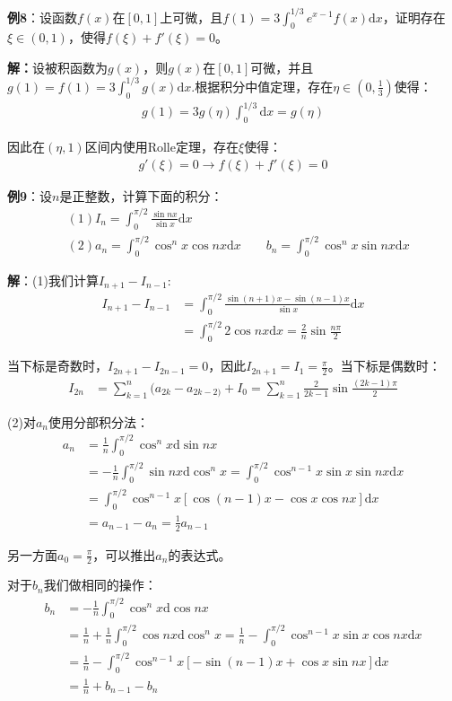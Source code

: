 \documentclass{ctexart}
\let\oldtextbf\textbf %
\renewcommand{\textbf}[1]{\textcolor{btex}{\oldtextbf{#1}}} %
\begin{document}
\textbf{例8}：设函数$f(x)$在$[0,1]$上可微，且$f(1)=3\int_0^{1/3}e^{x-1}f(x)\mathrm{d}x$，证明存在$\xi\in(0,1)$，使得$f(\xi)+f'(\xi)=0$。

\textbf{解：}设被积函数为$g(x)$，则$g(x)$在$[0,1]$可微，并且$g(1)=f(1)=3\int_0^{1/3}g(x)\mathrm{d}x$.根据积分中值定理，存在$\eta\in(0,\frac{1}{3})$使得：
\begin{align*}
    g(1)=3g(\eta)\int_0^{1/3}\mathrm{d}x=g(\eta)
\end{align*}

因此在$(\eta,1)$区间内使用Rolle定理，存在$\xi$使得：
\begin{align*}
    g'(\xi)=0\to f(\xi)+f'(\xi)=0
\end{align*}

\textbf{例9}：设$n$是正整数，计算下面的积分：
\begin{align*}
    &(1)I_n=\int_0^{\pi/2}\frac{\sin nx}{\sin x}\mathrm{d}x\\
    &(2)a_n=\int_0^{\pi/2}\cos^n x\cos nx\mathrm{d}x\qquad b_n=\int_0^{\pi/2}\cos^n x\sin nx\mathrm{d}x
\end{align*}

\textbf{解}：(1)我们计算$I_{n+1}-I_{n-1}$:
\begin{align*}
   I_{n+1}-I_{n-1}&=\int_0^{\pi/2}\frac{\sin(n+1)x-\sin(n-1)x}{\sin x}\mathrm{d}x\\
&=\int_0^{\pi/2}2\cos nx\mathrm{d}x=\frac{2}{n}\sin\frac{n\pi}{2} 
\end{align*}

当下标是奇数时，$I_{2n+1}-I_{2n-1}=0$，因此$I_{2n+1}=I_1=\frac{\pi}{2}$。当下标是偶数时：
\begin{align*}
I_{2n}&=\sum_{k=1}^n(a_{2k}-a_{2k-2)}+I_0=\sum_{k=1}^{n}\frac{2}{2k-1}\sin\frac{(2k-1)\pi}{2}
\end{align*}

(2)对$a_n$使用分部积分法：
\begin{align*}
a_n&=\frac{1}{n}\int_0^{\pi/2}\cos^nx\mathrm{d}\sin nx\\
&=-\frac{1}{n}\int_0^{\pi/2}\sin nx\mathrm{d}\cos^n x=\int_0^{\pi/2}\cos^{n-1}x\sin x\sin nx\mathrm{d}x\\
&=\int_0^{\pi/2}\cos^{n-1}x[\cos(n-1)x-\cos x\cos nx]\mathrm{d}x\\
&=a_{n-1}-a_n=\frac{1}{2}a_{n-1}   
\end{align*}

另一方面$a_0=\frac{\pi}{2}$，可以推出$a_n$的表达式。

对于$b_n$我们做相同的操作：
\begin{align*}
b_n&=-\frac{1}{n}\int_0^{\pi/2}\cos^nx\mathrm{d}\cos nx\\
&=\frac{1}{n}+\frac{1}{n}\int_0^{\pi/2}\cos nx\mathrm{d}\cos^n x=\frac{1}{n}- \int_0^{\pi/2}\cos^{n-1}x\sin x\cos nx\mathrm{d}x\\
&=\frac{1}{n}- \int_0^{\pi/2}\cos^{n-1}x[-\sin(n-1)x+\cos x\sin nx]\mathrm{d}x\\
&=\frac{1}{n} +b_{n-1}-b_n   
\end{align*}
\end{document}

